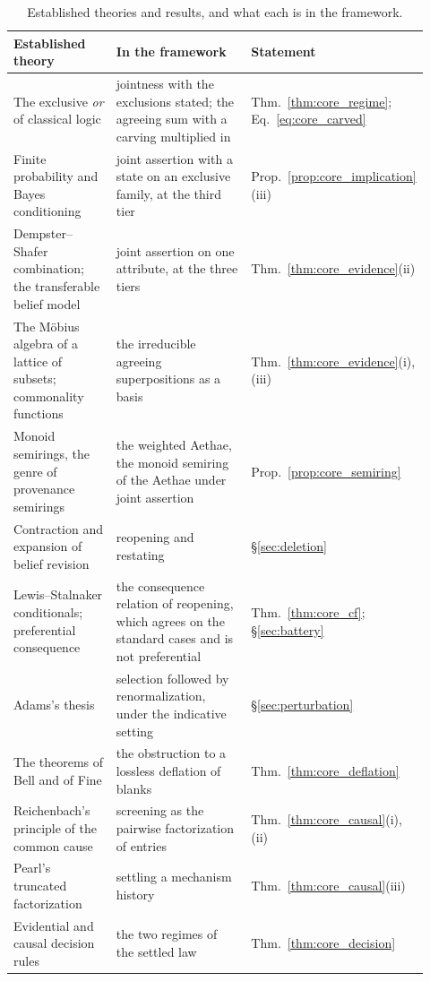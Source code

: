 \documentclass[11pt]{article}
\theoremstyle{definition}
\begin{document}
\begin{table}[t]
\centering
\small
\caption{Established theories and results, and what each is in the framework.}
\label{tab:core_theories}
\begin{tabular}{@{}p{0.30\linewidth}p{0.45\linewidth}p{0.17\linewidth}@{}}
\toprule
Established theory & In the framework & Statement \\
\midrule
The exclusive \emph{or} of classical logic & jointness with the exclusions stated; the agreeing sum with a carving multiplied in & Thm.~\ref{thm:core_regime}; Eq.~\eqref{eq:core_carved} \\
Finite probability and Bayes conditioning & joint assertion with a state on an exclusive family, at the third tier & Prop.~\ref{prop:core_implication}(iii) \\
Dempster--Shafer combination; the transferable belief model & joint assertion on one attribute, at the three tiers & Thm.~\ref{thm:core_evidence}(ii) \\
The M\"obius algebra of a lattice of subsets; commonality functions & the irreducible agreeing superpositions as a basis & Thm.~\ref{thm:core_evidence}(i), (iii) \\
Monoid semirings, the genre of provenance semirings & the weighted Aethae, the monoid semiring of the Aethae under joint assertion & Prop.~\ref{prop:core_semiring} \\
Contraction and expansion of belief revision & reopening and restating & \S\ref{sec:deletion} \\
Lewis--Stalnaker conditionals; preferential consequence & the consequence relation of reopening, which agrees on the standard cases and is not preferential & Thm.~\ref{thm:core_cf}; \S\ref{sec:battery} \\
Adams's thesis & selection followed by renormalization, under the indicative setting & \S\ref{sec:perturbation} \\
The theorems of Bell and of Fine & the obstruction to a lossless deflation of blanks & Thm.~\ref{thm:core_deflation} \\
Reichenbach's principle of the common cause & screening as the pairwise factorization of entries & Thm.~\ref{thm:core_causal}(i), (ii) \\
Pearl's truncated factorization & settling a mechanism history & Thm.~\ref{thm:core_causal}(iii) \\
Evidential and causal decision rules & the two regimes of the settled law & Thm.~\ref{thm:core_decision} \\

\end{tabular}
\end{table}
\end{document}
